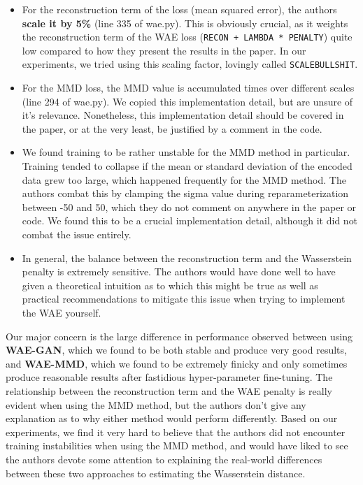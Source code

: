 \documentclass[12pt,english]{amsart}
\begin{document}
\begin{itemize}

    \item{For the reconstruction term of the loss (mean squared error), the
          authors \textbf{scale it by 5\%} (line 335 of wae.py). This is
          obviously crucial, as it weights the reconstruction term of the WAE
          loss (\verb|RECON + LAMBDA * PENALTY|) quite low compared to how they
          present the results in the paper. In our experiments, we tried using
          this scaling factor, lovingly called \verb|SCALEBULLSHIT|.}

    \item{For the MMD loss, the MMD value is accumulated times over different
          scales (line 294 of wae.py). We copied this implementation detail, but
          are unsure of it's relevance. Nonetheless, this implementation detail
          should be covered in the paper, or at the very least, be justified by
          a comment in the code.}

    \item{We found training to be rather unstable for the MMD method in
          particular. Training tended to collapse if the mean or standard
          deviation of the encoded data grew too large, which happened
          frequently for the MMD method. The authors combat this by clamping the
          sigma value during reparameterization between -50 and 50, which they
          do not comment on anywhere in the paper or code. We found this to be a
          crucial implementation detail, although it did not combat the issue
          entirely.}

    \item{In general, the balance between the reconstruction term and the
          Wasserstein penalty is extremely sensitive. The authors would have done
          well to have given a theoretical intuition as to which this might be true
          as well as practical recommendations to mitigate this issue when trying
          to implement the WAE yourself.}

\end{itemize}

Our major concern is the large difference in performance observed between using
\textbf{WAE-GAN}, which we found to be both stable and produce very good results,
and \textbf{WAE-MMD}, which we found to be extremely finicky and only sometimes
produce reasonable results after fastidious hyper-parameter fine-tuning. The
relationship between the reconstruction term and the WAE penalty is really evident
when using the MMD method, but the authors don't give any explanation as to why
either method would perform differently. Based on our experiments, we find it
very hard to believe that the authors did not encounter training instabilities
when using the MMD method, and would have liked to see the authors devote some
attention to explaining the real-world differences between these two approaches
to estimating the Wasserstein distance. \\



\end{document}
